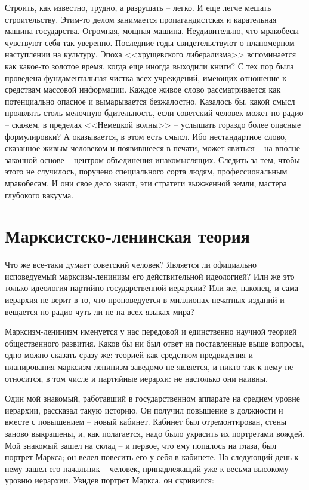 \documentclass{book}
\begin{document}
Строить, как известно, трудно, а разрушать -- легко. И еще легче мешать строительству. Этим-то делом занимается пропагандистская 
и карательная машина государства. Огромная, мощная машина. Неудивительно, что мракобесы чувствуют себя так уверенно. Последние 
годы свидетельствуют о планомерном наступлении на культуру. Эпоха <<хрущевского либе­рализма>> вспоминается как какое-то золотое 
время, когда еще иногда выходили книги?  С тех пор была проведена фундаментальная чистка всех учреждений, имеющих отношение к 
средствам массовой информации. Каждое живое слово рассматривается как потенциально опасное и вымарывается безжалостно. Казалось 
бы, какой смысл проявлять столь мелочную бдительность, если советский человек может по радио -- скажем, в пределах <<Немецкой 
волны>> -- услышать гораздо более опасные формулировки? А оказывается, в этом есть смысл. Ибо нестандартное слово, сказанное 
живым человеком и появившееся в печати, может явиться -- на вполне законной основе -- центром объединения инакомыслящих. Следить 
за тем, чтобы этого не случилось, поручено специального сорта людям, профессиональным мракобесам. И они свое дело знают, эти 
стратеги выжженной земли, мастера глубокого вакуума.


\section{Марксистско-ленинская теория}


Что же все-таки думает советский человек? Является ли официально исповедуемый марксизм-ленинизм его действи­тельной идеологией? Или же это только идеология партийно-государственной иерархии? Или же, наконец, и сама иерархия не верит в то, что проповедуется в миллионах печатных изда­ний и вещается по радио чуть ли не на всех языках мира?

Марксизм-ленинизм именуется у нас передовой и единствен­но научной теорией  общественного развития. Каков бы ни был ответ на поставленные выше вопросы, одно можно сказать сразу же: теорией как средством предвидения и планирования марксизм-ленинизм заведомо не является, и никто так к нему не относится, в том числе и партийные иерархи: не настолько они наивны.

Один мой знакомый, работавший в государственном аппа­рате на среднем уровне иерархии, рассказал такую историю. Он получил повышение в должности и вместе с повышением -- новый кабинет. Кабинет был отремонтирован, стены заново выкрашены, и, как полагается, надо было украсить их порт­ретами вождей. Мой знакомый зашел на склад -- и первое, что ему попалось на глаза, был портрет Маркса; он велел пове­сить его у себя в кабинете. На следующий день к нему зашел его начальник ~ человек, принадлежащий уже к весьма высо­кому уровню иерархии. Увидев портрет Маркса, он скривился:
\end{document}
